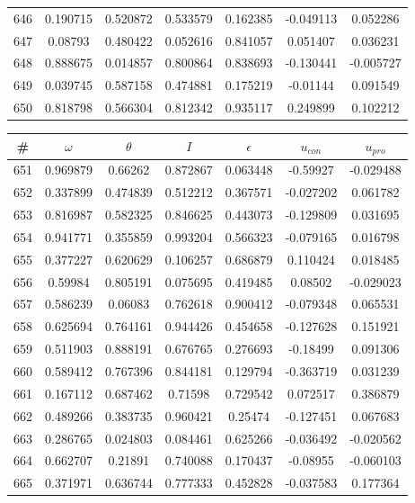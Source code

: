 \begin{table}
\begin{tabular}{c|c|c|c|c|c|c}
646 & 0.190715 & 0.520872 & 0.533579 & 0.162385 & -0.049113 & 0.052286\\
647 & 0.08793 & 0.480422 & 0.052616 & 0.841057 & 0.051407 & 0.036231\\
648 & 0.888675 & 0.014857 & 0.800864 & 0.838693 & -0.130441 & -0.005727\\
649 & 0.039745 & 0.587158 & 0.474881 & 0.175219 & -0.01144 & 0.091549\\
650 & 0.818798 & 0.566304 & 0.812342 & 0.935117 & 0.249899 & 0.102212\\
\end{tabular}
\end{table}
\newpage
\begin{table}
\begin{tabular}{c|c|c|c|c|c|c}
\# & $\omega$ & $\theta$ & $I$ & $\epsilon$ & $u_{con}$ & $u_{pro}$\\
\hline
651 & 0.969879 & 0.66262 & 0.872867 & 0.063448 & -0.59927 & -0.029488\\
652 & 0.337899 & 0.474839 & 0.512212 & 0.367571 & -0.027202 & 0.061782\\
653 & 0.816987 & 0.582325 & 0.846625 & 0.443073 & -0.129809 & 0.031695\\
654 & 0.941771 & 0.355859 & 0.993204 & 0.566323 & -0.079165 & 0.016798\\
655 & 0.377227 & 0.620629 & 0.106257 & 0.686879 & 0.110424 & 0.018485\\
656 & 0.59984 & 0.805191 & 0.075695 & 0.419485 & 0.08502 & -0.029023\\
657 & 0.586239 & 0.06083 & 0.762618 & 0.900412 & -0.079348 & 0.065531\\
658 & 0.625694 & 0.764161 & 0.944426 & 0.454658 & -0.127628 & 0.151921\\
659 & 0.511903 & 0.888191 & 0.676765 & 0.276693 & -0.18499 & 0.091306\\
660 & 0.589412 & 0.767396 & 0.844181 & 0.129794 & -0.363719 & 0.031239\\
661 & 0.167112 & 0.687462 & 0.71598 & 0.729542 & 0.072517 & 0.386879\\
662 & 0.489266 & 0.383735 & 0.960421 & 0.25474 & -0.127451 & 0.067683\\
663 & 0.286765 & 0.024803 & 0.084461 & 0.625266 & -0.036492 & -0.020562\\
664 & 0.662707 & 0.21891 & 0.740088 & 0.170437 & -0.08955 & -0.060103\\
665 & 0.371971 & 0.636744 & 0.777333 & 0.452828 & -0.037583 & 0.177364\\

\end{tabular}
\end{table}
